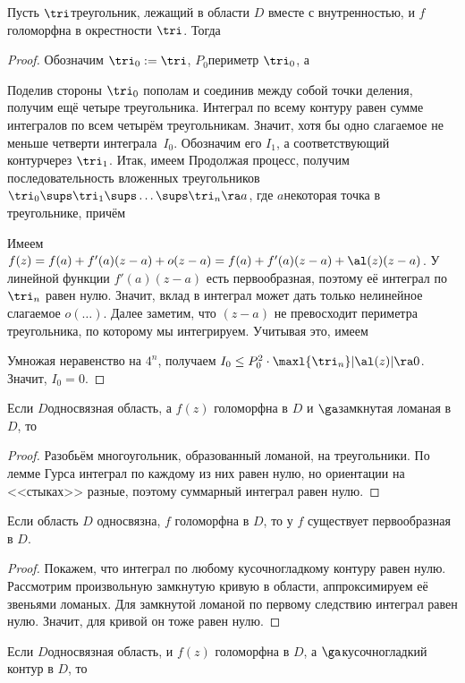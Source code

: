 \documentclass[a4paper]{article}
\begin{document}
\begin{lemma}[E.\,Goursat]
Пусть $\tri$\т треугольник, лежащий в области $D$ вместе с внутренностью, и $f$ голоморфна в
окрестности $\tri$. Тогда
\end{lemma}
\begin{proof}
Обозначим $\tri_0 := \tri$, $P_0$\т периметр $\tri_0$, а

Поделив стороны $\tri_{0}$ пополам и соединив между собой точки деления, получим ещё четыре треугольника.
Интеграл по всему контуру равен сумме интегралов по всем четырём треугольникам. Значит, хотя бы одно слагаемое не меньше
четверти интеграла~$I_0$. Обозначим его $I_1$, а соответствующий контур\т через $\tri_1$. Итак, имеем
Продолжая процесс, получим последовательность вложенных треугольников
$\tri_0 \sups \tri_1 \sups \ldots \sups \tri_n \ra a$, где $a$\т некоторая точка в треугольнике, причём

Имеем $f(z)=f(a)+f'(a)(z-a)+o(z-a)  = f(a) + f'(a)(z-a) + \al(z)(z-a)$.
У линейной функции $f'(a)(z-a)$ есть первообразная, поэтому её интеграл по $\tri_n$ равен нулю. Значит, вклад
в интеграл может дать только нелинейное слагаемое $o(\dots)$. Далее заметим, что $(z-a)$ не превосходит периметра
треугольника, по которому мы интегрируем. Учитывая это, имеем


Умножая неравенство на $4^n$, получаем $I_0 \le P_0^2\cdot\maxl{\tri_n}|\al(z)| \ra 0$. Значит, $I_0 = 0$.
\end{proof}
\begin{imp}
Если $D$\т односвязная область, а $f(z)$ голоморфна в $D$ и $\ga$\т замкнутая ломаная в $D$, то
\end{imp}
\begin{proof}
Разобьём многоугольник, образованный ломаной, на треугольники. По лемме Гурса интеграл по каждому из них равен нулю,
но ориентации на <<стыках>> разные, поэтому суммарный интеграл равен нулю.
\end{proof}
\begin{imp}
Если область $D$ односвязна, $f$ голоморфна в $D$, то у $f$ существует первообразная в $D$.
\end{imp}
\begin{proof}
Покажем, что интеграл по любому кусочно\д гладкому контуру равен нулю. Рассмотрим произвольную замкнутую
кривую в области, аппроксимируем её звеньями ломаных. Для замкнутой ломаной по первому следствию интеграл равен
нулю. Значит, для кривой он тоже равен нулю.
\end{proof}
\begin{imp}
Если $D$\т односвязная область, и $f(z)$ голоморфна в $D$, а $\ga$\т кусочно\д гладкий контур в $D$, то
\end{imp}
\end{document}
